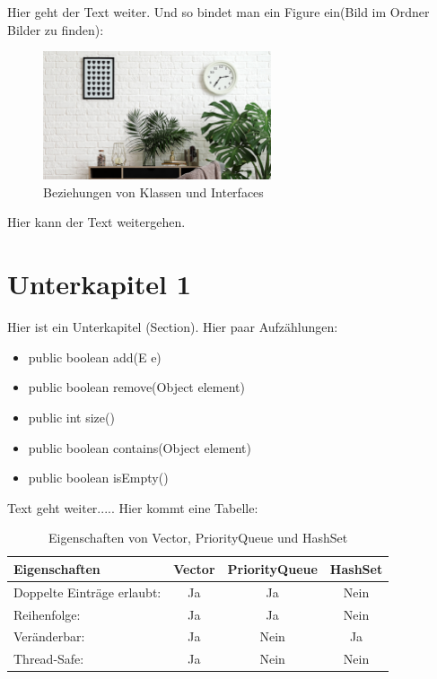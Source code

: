 \documentclass[fontsize=12pt,paper=a4,open=any,parskip=half,
  twoside=false,toc=listof,toc=bibliography,fleqn,leqno,
  captions=nooneline,captions=tableabove,british]{scrbook}
\begin{document}
Hier geht der Text weiter. Und so bindet man ein Figure ein(Bild im Ordner Bilder zu finden):


\begin{figure}[htbp]
 \centering
 \includegraphics[width=0.6\textwidth]{Bilder/bildname}
 \captionsetup{justification=centering,margin=2cm}
 \caption{Beziehungen von Klassen und Interfaces \autocite{jtpinterface}}
 \label{interface-relation}
\end{figure}

Hier kann der Text weitergehen.


\section{Unterkapitel 1}\label{sec:c.f}
Hier ist ein Unterkapitel (Section). Hier paar Aufzählungen:

\begin{itemize}
 \item public boolean add(E e) 
 \item public boolean remove(Object element)
 \item public int size()
 \item public boolean contains(Object element)
 \item public boolean isEmpty()
\end{itemize}

Text geht weiter..... Hier kommt eine Tabelle:

\begin{table}[htbp]
\caption{Eigenschaften von Vector, PriorityQueue und HashSet}
\label{data-table}
\centering
  \begin{tabular}{l  c  c  c} 
\toprule
    Eigenschaften & Vector & PriorityQueue & HashSet\\ 
\midrule  
    Doppelte Einträge erlaubt:   		& Ja  	&  Ja  	& Nein \\
    Reihenfolge:   						& Ja 	&  Ja 		& Nein \\ 
	Veränderbar:   						& Ja	&  Nein 	& Ja \\ 
	Thread-Safe:   						& Ja 	& Nein 	& Nein\\ 
  \end{tabular}

\end{table}
\end{document}
